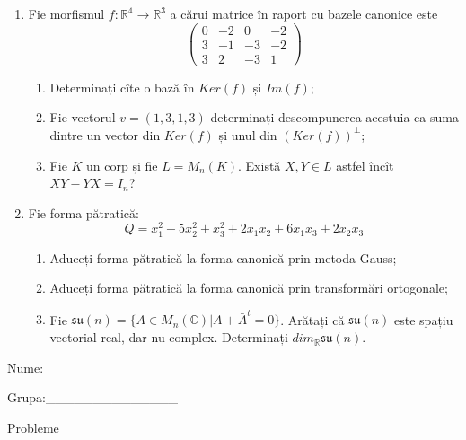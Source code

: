 \documentclass{article}
\begin{document}
\begin{enumerate}
 \item Fie morfismul $f:\mathbb{R}^4 \to \mathbb{R}^3$ a cărui matrice în raport cu bazele canonice este
$$\begin{pmatrix}
0&-2&0&-2\\
3&-1&-3&-2\\
3&2&-3&1
\end{pmatrix}$$

\begin{enumerate}
\item Determinați cîte o bază în $Ker(f)$ și $Im(f)$;
\item Fie vectorul $v=(1,3,1,3)$ determinați descompunerea acestuia ca suma dintre un vector din $Ker(f)$ și unul din $(Ker(f))^\perp$;
\item Fie $K$ un corp și fie $L=M_n(K)$. Există $X,Y \in L$ astfel încît $XY-YX=I_n$?  
\end{enumerate}
\item Fie forma pătratică:
$$Q= x_1^2+5x_2^2+x_3^2+2x_1x_2+6x_1x_3+2x_2x_3$$

\begin{enumerate}
\item Aduceți forma pătratică la forma canonică prin metoda Gauss;
\item Aduceți forma pătratică la forma canonică prin transformări ortogonale;
\item Fie $\mathfrak{su}(n)=\{ A \in M_n(\mathbb{C}) | A+\bar{A}^t=0\}$. Arătați că $\mathfrak{su}(n)$ este spațiu vectorial real, dar nu complex.
Determinați $dim_{\mathbb{R}}\mathfrak{su}(n)$.
\end{enumerate}
\end{enumerate}
\newpage
\begin{flushright}
Nume:\_\_\_\_\_\_\_\_\_\_\_\_\_\_
 
 
Grupa:\_\_\_\_\_\_\_\_\_\_\_\_\_\_
\end{flushright}
\begin{center}
\vspace{2cm}
{\Large Probleme}
\vspace{2cm}
\end{center}
\end{document}
